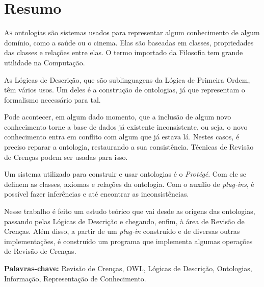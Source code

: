\chapter*{Resumo}

\lettrine{A}{s} ontologias são sistemas usados para representar algum conhecimento de algum do\-mí\-nio, como a saúde ou o cinema. Elas são baseadas em classes, propriedades das classes e relações entre elas. O termo importado da Filosofia tem grande utilidade na Com\-pu\-ta\-ção.

As Lógicas de Descrição, que são sublinguagens da Lógica de Primeira Ordem, têm vários usos. Um deles é a construção de ontologias, já que representam o formalismo necessário para tal. 

Pode acontecer, em algum dado momento, que a inclusão de algum novo conhecimento torne a base de dados já existente inconsistente, ou seja, o novo conhecimento entra em conflito com algum que já estava lá. Nestes casos, é preciso reparar a ontologia, restaurando a sua consistência. Técnicas de Revisão de Crenças podem ser usadas para isso.

Um sistema utilizado para construir e usar ontologias é o \textit{Protégé}. Com ele se definem as classes, axiomas e relações da ontologia. Com o auxílio de \textit{plug-ins}, é possível fazer inferências e até encontrar as inconsistências. 

Nesse trabalho é feito um estudo teórico que vai desde as origens das ontologias, passando pelas Lógicas de Descrição e chegando, enfim, à área de Revisão de Crenças. Além disso, a partir de um \textit{plug-in} construído e de diversas outras implementações, é construído um programa que implementa algumas operações de Revisão de Crenças.

\noindent \textbf{Palavras-chave:} Revisão de Crenças, OWL, Lógicas de Descrição, Ontologias, Informação, Representação de Conhecimento.